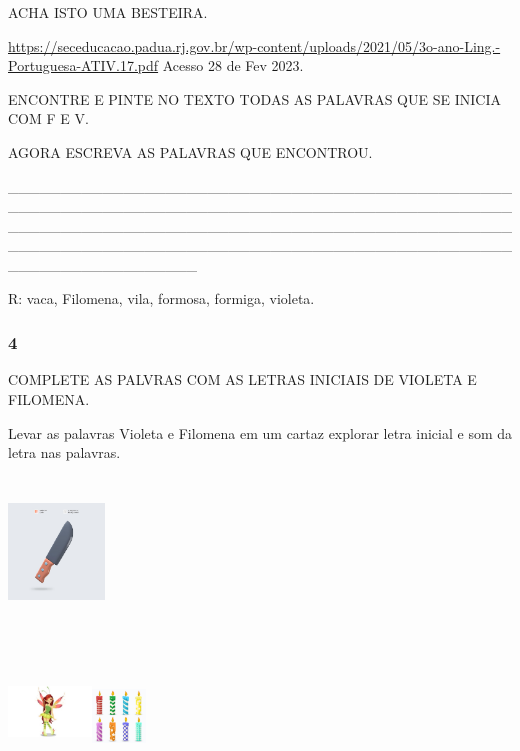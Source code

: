ACHA ISTO UMA BESTEIRA.

\url{https://seceducacao.padua.rj.gov.br/wp-content/uploads/2021/05/3o-ano-Ling.-Portuguesa-ATIV.17.pdf}
Acesso 28 de Fev 2023.

ENCONTRE E PINTE NO TEXTO TODAS AS PALAVRAS QUE SE INICIA COM F E V.

AGORA ESCREVA AS PALAVRAS QUE ENCONTROU.

\_\_\_\_\_\_\_\_\_\_\_\_\_\_\_\_\_\_\_\_\_\_\_\_\_\_\_\_\_\_\_\_\_\_\_\_\_\_\_\_\_\_\_\_\_\_\_\_\_\_\_\_\_\_\_\_\_\_\_\_\_\_\_\_\_\_\_\_\_\_\_\_\_\_\_\_\_\_\_\_\_\_\_\_\_\_\_\_\_\_\_\_\_\_\_\_\_\_\_\_\_\_\_\_\_\_\_\_\_\_\_\_\_\_\_\_\_\_\_\_\_\_\_\_\_\_\_\_\_\_\_\_\_\_\_\_\_\_\_\_\_\_\_\_\_\_\_\_\_\_\_\_\_\_\_\_\_\_\_\_\_\_\_\_\_\_\_\_\_\_\_\_\_\_\_\_\_\_\_\_\_\_\_\_\_\_\_\_\_\_\_\_\_\_\_\_\_\_\_\_\_\_\_\_\_\_\_\_\_\_

R: vaca, Filomena, vila, formosa, formiga, violeta.

\subsubsection{4}\label{section-3}

COMPLETE AS PALVRAS COM AS LETRAS INICIAIS DE VIOLETA E FILOMENA.

Levar as palavras Violeta e Filomena em um cartaz explorar letra inicial
e som da letra nas palavras.

\includegraphics[width=1.01042in,height=1.55278in]{media/image7.jpeg}

\includegraphics[width=0.87500in,height=1.40486in]{media/image8.jpeg}\includegraphics[width=0.56250in,height=1.32083in]{media/image9.jpeg}

